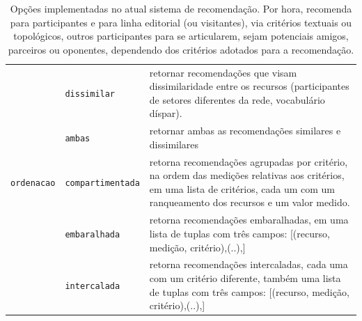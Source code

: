 \documentclass[12pt]{article}
\begin{document}
\begin{table}
\begin{center}
\begin{tabular}{|l|l|p{10cm}|}
                       & \texttt{dissimilar}    & retornar recomendações que visam dissimilaridade entre os recursos (participantes de setores diferentes da rede, vocabulário díspar).                 \\
                       & \texttt{ambas}    & retornar ambas as recomendações similares e dissimilares                      \\\hline
\texttt{ordenacao}     & \texttt{compartimentada} & retorna recomendações agrupadas por critério, na ordem das medições relativas aos critérios, em uma lista de critérios, cada um com um ranqueamento dos recursos e um valor medido. \\
                       & \texttt{embaralhada}    & retorna recomendações embaralhadas, em uma lista de tuplas com três campos: [(recurso, medição, critério),(..),]                \\
                       & \texttt{intercalada}    & {\raggedright retorna recomendações intercaladas, cada uma com um critério diferente, também uma lista de tuplas com três campos:  [(recurso, medição, critério),(..),]       }        \\\hline
\end{tabular}
\caption[Table caption text]{Opções implementadas no atual sistema de recomendação. Por hora, recomenda para participantes e para linha editorial (ou visitantes), via critérios textuais ou topológicos, outros participantes para se articularem, sejam potenciais amigos, parceiros ou oponentes, dependendo dos critérios adotados para a recomendação.}
\label{tab:srCampos}
\end{center}
\end{table}
\end{document}
